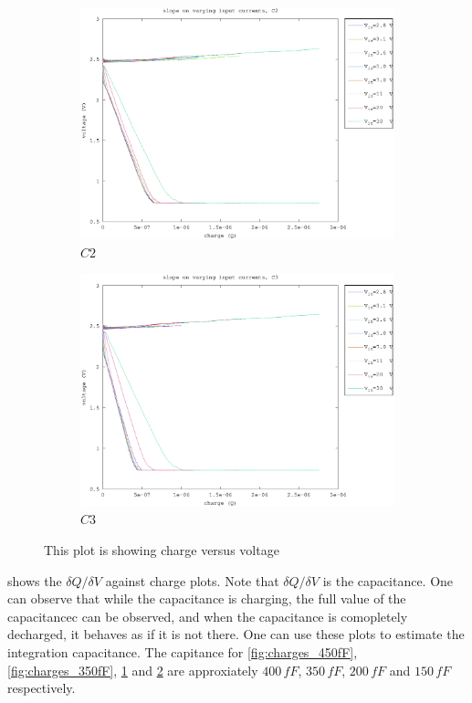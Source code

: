 \begin{figure}[h]
\begin{subfigure}[b]{0.475\textwidth}
    \centering 
    \includegraphics[width=\textwidth]{fig/charge_150fF.eps}
    \caption[]
        {$C2$}    
        \label{fig:charges_150fF}
\end{subfigure}
\quad
\begin{subfigure}[b]{0.475\textwidth}   
    \centering 
    \includegraphics[width=\textwidth]{fig/charge_50fF.eps}
    \caption[]
        {$C3$}    
        \label{fig:charges_50fF}
\end{subfigure}
\caption{This plot is showing charge versus voltage}
\label{fig:charges}
\end{figure}

 shows the $\delta Q/\delta V$ against charge plots. Note that $\delta Q/\delta V$ is the capacitance. One can observe that while the capacitance is charging, the full value of the capacitancec can be observed, and when the capacitance is comopletely decharged, it behaves as if it is not there. One can use these plots to estimate the integration capacitance. The capitance for \cref{fig:charges_450fF}, \ref{fig:charges_350fF}, \ref{fig:charges_150fF} and \ref{fig:charges_50fF} are approxiately $400\,fF$, $350\,fF$, $200\,fF$ and $150\,fF$ respectively.


